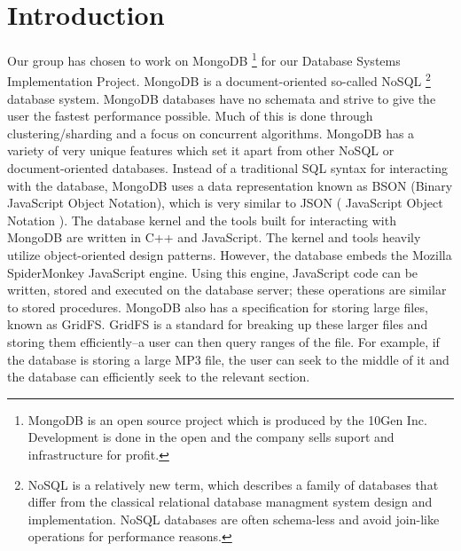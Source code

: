 \documentclass{../dependencies/acm_proc_article-sp}
\begin{document}
%

%

\section{Introduction}
Our group has chosen to work on MongoDB 
\footnote{MongoDB is an open source project which is produced by the 10Gen Inc.
          Development is done in the open and the company sells suport and infrastructure for profit. }
          for our Database Systems
Implementation Project. MongoDB is a document-oriented so-called NoSQL 
\footnote{ NoSQL is a relatively new term, which describes a family of databases that differ from the classical relational database managment system design and implementation. NoSQL databases are often schema-less and avoid join-like operations for performance reasons. }
database system. MongoDB databases have no schemata and strive to give the user
the fastest performance possible. Much of this is done through clustering/sharding
and a focus on concurrent algorithms. MongoDB has a variety of very unique
features which set it apart from other NoSQL or document-oriented databases.
Instead of a traditional SQL syntax for interacting with the database, MongoDB uses
a data representation known as BSON (Binary JavaScript Object Notation), which is very similar
to JSON ( JavaScript Object Notation ).
%
The database kernel and the tools built for interacting with MongoDB are written in
C++ and JavaScript. The kernel and tools heavily utilize object-oriented design patterns.
However, the database embeds the Mozilla SpiderMonkey JavaScript engine.
Using this engine, JavaScript code can be written, stored and executed on the database server; these
operations are similar to stored procedures. MongoDB also has a specification for storing
large files, known as GridFS. GridFS is a standard for breaking up these larger
files and storing them efficiently--a user can then query ranges of the file. For example, if the
database is storing a large MP3 file, the user can seek to the middle of it and the database can
efficiently seek to the relevant section.
\end{document}
